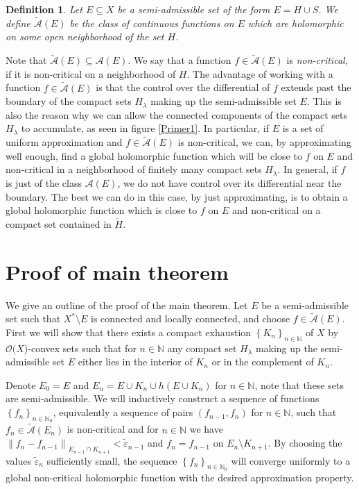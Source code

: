 \documentclass[a4paper,11pt]{amsart}
\newcommand{\N}{\mathbb N}
\newcommand{\set}[1]{\left\{#1\right\}}
\newcommand{\norm}[1]{\left\lVert#1\right\rVert}
\newtheorem{definition}{Definition}
\begin{document}
\begin{definition} \label{Atilde}
    Let $E \subseteq X$ be a semi-admissible set of the form $E = H \cup S$. 
    We define $\widetilde{\mathcal{A}}(E)$ be the class of continuous functions on $E$ which are holomorphic on some open neighborhood of the set $H$.
\end{definition}
Note that $\widetilde{\mathcal{A}}(E) \subseteq \mathcal{A}(E)$.
We say that a function $f \in \widetilde{\mathcal{A}}(E)$ is \emph{non-critical}, if it is non-critical on a neighborhood of $H$.
The advantage of working with a function $f \in \widetilde{\mathcal{A}}(E)$ is that the control over the differential of $f$ extends past the boundary of the compact sets $H_\lambda$ making up the semi-admissible set $E$.
This is also the reason why we can allow the connected components of the compact sets $H_\lambda$ to accumulate, as seen in figure \ref{Primer1}. 
In particular, if $E$ is a set of uniform approximation and $f \in \widetilde{\mathcal{A}}(E)$ is non-critical, we can, by approximating well enough, find a global holomorphic function which will be close to $f$ on $E$ and non-critical in a neighborhood of finitely many compact sets $H_\lambda$.
In general, if $f$ is just of the class $\mathcal{A}(E)$, we do not have control over its differential near the boundary. 
The best we can do in this case, by just approximating, is to obtain a global holomorphic function which is close to $f$ on $E$ and non-critical on a compact set contained in $\mathring{H}$. 

\section{Proof of main theorem} \label{MainProof}

We give an outline of the proof of the main theorem. Let $E$ be a semi-admissible set such that $X^* \setminus E$ is connected and locally connected, and choose $f \in \widetilde{\mathcal{A}}(E)$.
First we will show that there exists a compact exhaustion $\set{K_n}_{n \in \N}$ of $X$ by $\mathcal{O}(X$)-convex sets 
such that for $n \in \N$ any compact set $H_\lambda$ making up the semi-admissible set $E$ either lies in the interior of $K_n$ or in the complement of $K_n$.

Denote $E_0 = E$ and $E_n = E \cup K_n \cup h(E \cup K_n)$ for $n \in \N$, note that these sets are semi-admissible. 
We will inductively construct a sequence of functions $\set{f_n}_{n \in \N_0}$, equivalently a sequence of pairs $(f_{n-1}, f_n)$ for $n \in \N$, such that $f_n \in \widetilde{\mathcal{A}}(E_n)$ is non-critical and for $n \in \N$ we have $\norm{f_n - f_{n-1}}_{E_{n-1} \cap K_{n+1}} < \tilde{\varepsilon}_{n-1}$ and $f_n = f_{n-1}$ on $E_n \setminus K_{n+1}$.
By choosing the values $\tilde{\varepsilon}_n$ sufficiently small, 
the sequence $\set{f_n}_{n \in \N_0}$ will converge uniformly to a global non-critical holomorphic function with the desired approximation property.     
\end{document}
